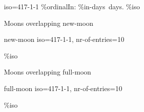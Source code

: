\documentclass[paper=landscape]{scrartcl}
\begin{document}
\begin{multicols}{2}


\GetNextMoonphase {} { iso=417-1-1 } 
  {  
    \%{ordinal}\space In: \%{in-days}\ days. \%{iso} 
  }


Moons overlapping new-moon
\begin{itemize}
\CompareMoons { \Surios , \Eria } { new-moon } { iso=417-1-1, nr-of-entries=10 } 
  {
    \item {}  \%{iso} 
 }
 \end{itemize}
 
Moons overlapping full-moon 
\begin{itemize}
\CompareMoons { \Surios , \Eria } { full-moon } { iso=417-1-1, nr-of-entries=10 } 
  {
    \item {}  \%{iso} 
 }
 \end{itemize}
 
\end{multicols}
\end{document}
